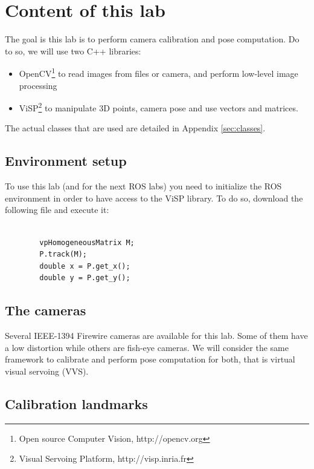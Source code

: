 \documentclass{ecnreport}
\begin{document}




\section{Content of this lab}

The goal is this lab is to perform camera calibration and pose computation. Do to so, we will use two C++ libraries:
\begin{itemize}
 \item OpenCV\footnote{Open source Computer Vision, http://opencv.org} to read images from files or camera, and perform low-level image processing
 \item ViSP\footnote{Visual Servoing Platform, http://visp.inria.fr} to manipulate 3D points, camera pose and use vectors and matrices.
\end{itemize}
The actual classes that are used are detailed in Appendix \ref{sec:classes}.\\

\subsection{Environment setup}

To use this lab (and for the next ROS labs) you need to initialize the ROS environment in order to have access to the ViSP library.
To do so, download the following file and execute it:
\begin{center}\cppstyle
\begin{lstlisting}
        
        vpHomogeneousMatrix M;
        P.track(M);
        double x = P.get_x();
        double y = P.get_y();
\end{lstlisting}
\end{center}

\subsection{The cameras}

Several IEEE-1394 Firewire cameras are available for this lab. Some of them have a low distortion while others are fish-eye cameras. We will consider the 
same framework to calibrate and perform pose computation for both, that is virtual visual servoing (VVS).

\subsection{Calibration landmarks}
\end{document}
